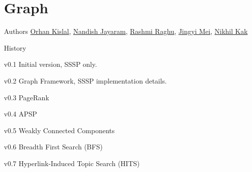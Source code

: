



\chapter[Graph]{Graph}

\begin{moduleinfo}
\item[Authors] \href{mailto:okislal@pivotal.io}{Orhan Kislal}, \href{mailto:njayaram@pivotal.io}{Nandish Jayaram},
			   \href{mailto:rraghu@pivotal.io}{Rashmi Raghu}, \href{mailto:jmei@pivotal.io@pivotal.io}{Jingyi Mei},
			   \href{mailto:nkak@pivotal.io}{Nikhil Kak}
\item[History]
	\begin{modulehistory}
		\item[v0.1] Initial version, SSSP only.
		\item[v0.2] Graph Framework, SSSP implementation details.
        \item[v0.3] PageRank
        \item[v0.4] APSP
        \item[v0.5] Weakly Connected Components
        \item[v0.6] Breadth First Search (BFS)
        \item[v0.7] Hyperlink-Induced Topic Search (HITS)
	\end{modulehistory}
\end{moduleinfo}



